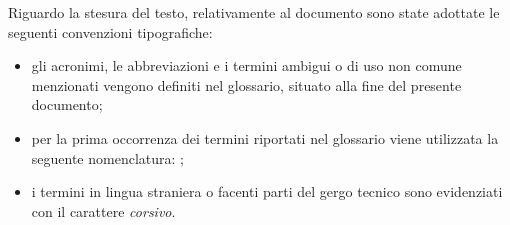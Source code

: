 Riguardo la stesura del testo, relativamente al documento sono state adottate le seguenti convenzioni tipografiche:
\begin{itemize}
	\item gli acronimi, le abbreviazioni e i termini ambigui o di uso non comune menzionati vengono definiti nel glossario, situato alla fine del presente documento;
	\item per la prima occorrenza dei termini riportati nel glossario viene utilizzata la seguente nomenclatura: ;
	\item i termini in lingua straniera o facenti parti del gergo tecnico sono evidenziati con il carattere \emph{corsivo}.
\end{itemize}